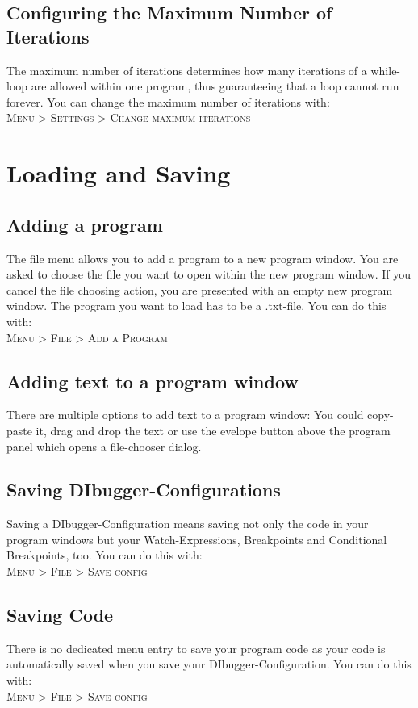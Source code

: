 \documentclass[parskip=full]{memoir}
\begin{document}
\section{Configuring the Maximum Number of Iterations}
The maximum number of iterations determines how many iterations of a while-loop are allowed within one program, thus guaranteeing that a loop cannot run forever.
You can change the maximum number of iterations with: \\
\textsc{Menu > Settings > Change maximum iterations}
\chapter{Loading and Saving} %
\section{Adding a program}
The file menu allows you to add a program to a new program window. You are asked to choose the file you want to open within the new program window. If you cancel the file choosing action, you are presented with an empty new program window. The program you want to load has to be a .txt-file. You can do this with: \\
 \textsc{Menu > File > Add a Program}
 
 \section{Adding text to a program window}
 There are multiple options to add text to a program window: You could copy-paste it, drag and drop the text or use the evelope button above the program panel which opens a file-chooser dialog.
 \section{Saving DIbugger-Configurations}
Saving a DIbugger-Configuration means saving not only the code in your program windows but your Watch-Expressions, Breakpoints and Conditional Breakpoints, too.
You can do this with: \\
\textsc{Menu > File > Save config}
\section{Saving Code}
There is no dedicated menu entry to save your program code as your code is automatically saved when you save your DIbugger-Configuration. You can do this with: \\
\textsc{Menu > File > Save config}
\end{document}

